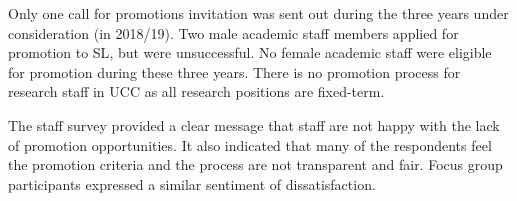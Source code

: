 
Only one call for promotions invitation was sent out during the three years under consideration (in 2018/19). Two male academic staff members applied for promotion to \ac{SL}, but were unsuccessful. %
No female academic staff were eligible for promotion during these three years. 
There is no promotion process for research staff in UCC as all research positions are fixed-term. 


The staff survey provided a clear message that staff are not happy with the lack of promotion opportunities. It also indicated that many of the respondents feel the promotion criteria and the process are not transparent and fair. Focus group participants expressed a similar sentiment of dissatisfaction. %




